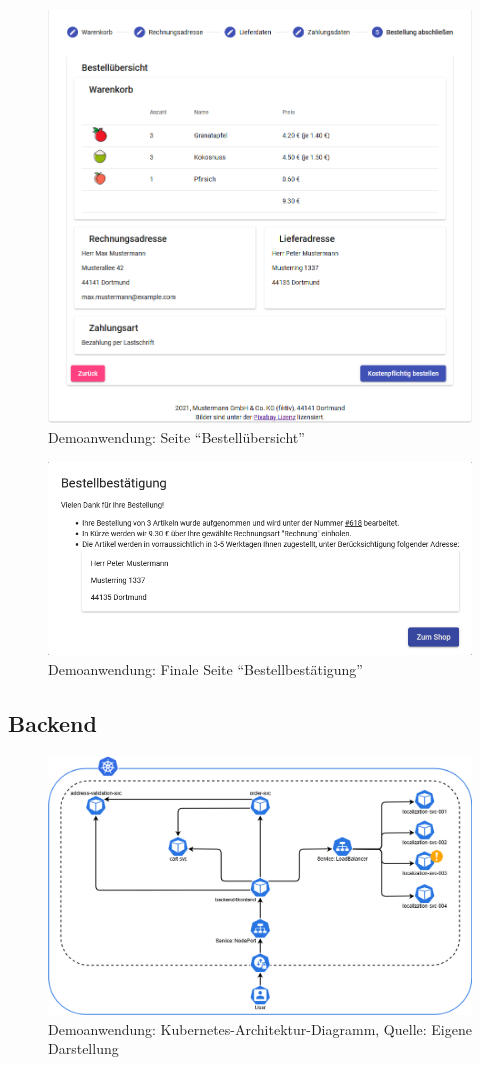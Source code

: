 \begin{figure}[H]
	\centering
	\includegraphics[width=0.75\linewidth]{img/04_erstellung-poc/demoanwendung_vorstellung_05-bestelluebersicht.png}
	\caption{Demoanwendung: Seite \enquote{Bestellübersicht}}
	\label{fig:demoanwendung_vorstellung_05-bestelluebersicht}
\end{figure}

\begin{figure}[H]
	\centering
	\includegraphics[width=0.75\linewidth]{img/04_erstellung-poc/demoanwendung_vorstellung_06-bestellbestaetigung.png}
	\caption{Demoanwendung: Finale Seite \enquote{Bestellbestätigung}}
	\label{fig:demoanwendung_vorstellung_06-bestellbestaetigung}
\end{figure}

\subsection{Backend}

\begin{figure}[H]
	\centering
	\includegraphics[width=1.0\linewidth]{img/04_erstellung-poc/demoanwendung_k8s-deployment.png}
	\caption{Demoanwendung: Kubernetes-Architektur-Diagramm, Quelle: Eigene Darstellung}
	\label{fig:demoanwendung_k8s-deployment}
\end{figure}